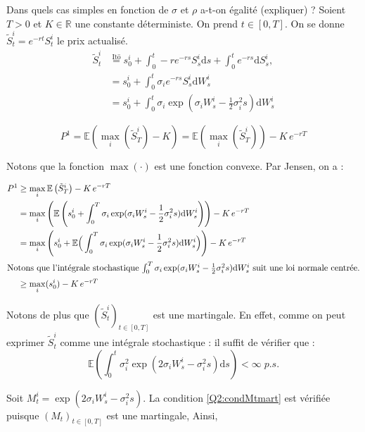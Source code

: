\documentclass{article}
\newcommand{\R}{\mathbb{R}}
\newcommand{\E}{\mathbb{E}}
\newcommand{\1}{\mathbbm{1}}
\renewcommand{\d}{\mathrm{d}}
\begin{document}
Dans quels cas simples en fonction de $\sigma$ et $\rho$ a-t-on égalité (expliquer) ?
Soient $T>0$ et $K\in \R$ une constante déterministe. On prend  $t \in [0, T]$. 
On se donne $\tilde S^i_t = e^{-rt} S^i_t$ le prix actualisé.
\begin{align*}
  \tilde S^i_t &\overset{\text{Itō}}{=} s^i_0 + \int_0^t -r e^{-rs} S^i_s \d s + \int_0^t e^{-rs} \d S^i_s,\\
               &= s^i_0 +  \int_0^t \sigma_i e^{-rs} S^i_s \d W^i_s\\
  &= s^i_0 + \int_0^t \sigma_i \exp\left(\sigma_i W^i_s - \frac{1}{2}\sigma_i^2 s\right) \d W^i_s
\end{align*}

\begin{equation}
  P^1 = \E\left(\max_i(\tilde S^i_T) - K\right) =  \E\left(\max_i(\tilde S^i_T)\right) - K \,e^{-rT}
\end{equation}

Notons que la fonction $\max(\cdot)$ est une fonction convexe. Par Jensen, on a :

\begin{align*}
  P^1 &\geq \max_i \E\left(\tilde S^i_T\right) - K\,e^{-rT}\\
      &=  \max_i\left( \E\left(s^i_0 + \int_0^T \sigma_i \exp(\sigma_i W^i_s - \frac{1}{2} \sigma_i^2 s) \d W^i_s\right)\right) - K\,e^{-rT}\\
      &= \max_i\Bigg(s^i_0 +  \E\Big(\int_0^T \sigma_i \exp(\sigma_i W^i_s - \frac{1}{2} \sigma_i^2 s) \d W^i_s\Big)\Bigg) - K\,e^{-rT}\\
  \intertext{Notons que l'intégrale stochastique $\int_0^T \sigma_i \exp(\sigma_i W^i_s - \frac{1}{2} \sigma_i^2 s) \d W^i_s$ suit une loi normale centrée.}
  &\geq \max_i(s^i_0) - K\,e^{-rT}
\end{align*}

Notons de plus que $(\tilde S^i_t)_{t\in[0,T]}$ est une martingale. En effet, comme on peut exprimer  $\tilde S^i_t$ comme une intégrale stochastique : il suffit de vérifier que :
\begin{equation}\label{Q2:condMtmart}
  \E\left(\int_0^t \sigma_i^2 \exp\left(2 \sigma_i W^i_s - \sigma_i^2 s\right) \d s\right) < \infty \;p.s.
  \end{equation}

  Soit $M^i_t = \exp\left(2 \sigma_i W^i_s - \sigma_i^2 s\right)$. La condition \eqref{Q2:condMtmart} est vérifiée puisque $(M_t)_{t \in [0,T]}$ est une martingale, Ainsi, 
\end{document}

